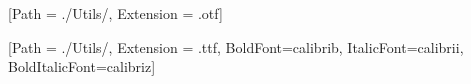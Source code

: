 




\setmainfont{AvenirLTStd-Roman}[Path = ./Utils/, Extension = .otf]




\setmainfont{calibri-regular}[Path = ./Utils/, Extension = .ttf, BoldFont=calibrib, ItalicFont=calibrii, BoldItalicFont=calibriz]


\MyIndex

\hypersetup{linkcolor=AzulInfo}

\newpage








